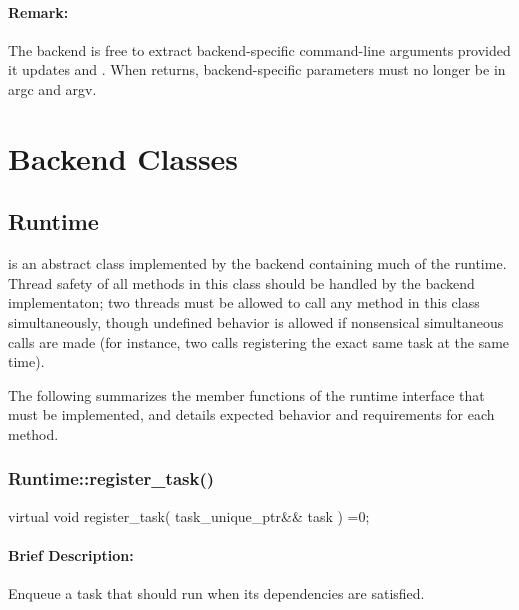 \paragraph{Remark:} The backend is free to extract backend-specific command-line arguments provided it
   updates  and .  When  returns, backend-specific parameters
   must no longer be in argc and argv.


\section{Backend Classes}

\subsection{{Runtime}}
 is an abstract class implemented by the backend containing
much of the runtime.  Thread safety of all methods in this class should be handled by the backend implementaton;
two threads must  be allowed to call any method in this class simultaneously, though undefined behavior
is allowed if nonsensical simultaneous calls are made (for instance, two calls registering the exact same
task at the same time).

The following summarizes the member functions of the runtime interface that
must be implemented, and details expected behavior and requirements for each
method.




\subsubsection{ Runtime::register\_task() }
\begin{CppCode}
virtual void register_task(
      task_unique_ptr&& task
    ) =0;
\end{CppCode}

\paragraph{Brief Description:} Enqueue a task that should run when its
dependencies are satisfied.
     
